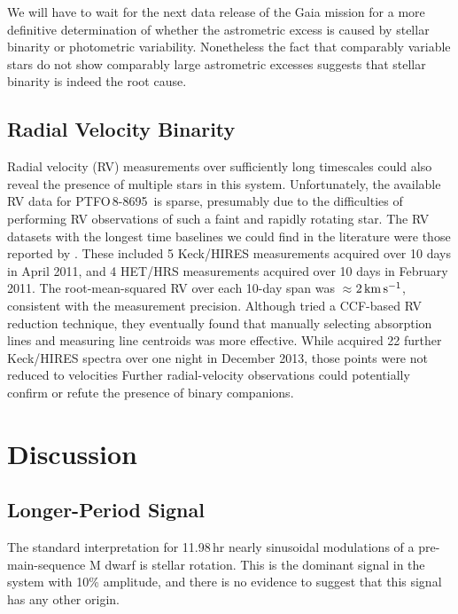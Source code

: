 \documentclass[12pt,twocolumn,tighten,trackchanges]{aastex62}
\newcommand{\ptfo}{PTFO$\,$8-8695}
\begin{document}
We will have to wait for the next data release of the Gaia mission for
a more definitive determination of whether the astrometric excess is
caused by stellar binarity or photometric variability.  Nonetheless
the fact that comparably variable stars do not show comparably large
astrometric excesses suggests that stellar binarity is indeed the root
cause.

\subsection{Radial Velocity Binarity}

Radial velocity (RV) measurements over sufficiently long timescales
could also reveal the presence of multiple stars in this system.
Unfortunately, the available RV data for \ptfo\ is sparse, presumably
due to the difficulties of performing RV observations of such a faint
and rapidly rotating star.  The RV datasets with the longest time
baselines we could find in the literature were those reported by
\citet{van_eyken_ptf_2012}.  These included 5 Keck/HIRES measurements
acquired over 10 days in April 2011, and 4 HET/HRS measurements
acquired over 10 days in February 2011.  The root-mean-squared RV over
each 10-day span was $\approx$$2\,{\rm km}\,{\rm s}^{-1}$, consistent
with the measurement precision.  Although \citet{van_eyken_ptf_2012}
tried a CCF-based RV reduction technique, they eventually found that
manually selecting absorption lines and measuring line centroids was
more effective.  While \citet{yu_tests_2015} acquired 22 further
Keck/HIRES spectra over one night in December 2013, those points were
not reduced to velocities Further radial-velocity observations could
potentially confirm or refute the presence of binary companions.

\section{Discussion}
\label{sec:discussion}

\subsection{Longer-Period Signal}

The standard interpretation for 11.98$\,$hr nearly sinusoidal
modulations of a pre-main-sequence M dwarf is stellar rotation.  This
is the dominant signal in the system with 10\% amplitude, and there is
no evidence to suggest that this signal has any other origin.
\end{document}
